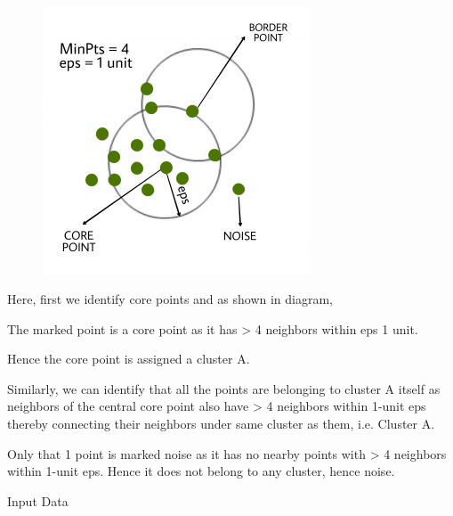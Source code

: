 \documentclass[12pt]{article}
\renewcommand{\_}{\kern-1.5pt\textunderscore\kern-1.5pt}
\begin{document}
\begin{figure}[H]
	\begin{Center}
		\includegraphics[width=3.12in,height=3.12in]{./media/image5.jpeg}
	\end{Center}
\end{figure}



\par

Here, first we identify core points and as shown in diagram, \par

The marked point is a core point as it has > 4 neighbors within eps 1 unit.\par

Hence the core point is assigned a cluster A.\par

Similarly, we can identify that all the points are belonging to cluster A itself as neighbors of the central core point also have > 4 neighbors within 1-unit eps thereby connecting their neighbors under same cluster as them, i.e. Cluster A.\par

Only that 1 point is marked noise as it has no nearby points with > 4 neighbors within 1-unit eps. Hence it does not belong to any cluster, hence noise.\par

Input Data\par



\end{document}
